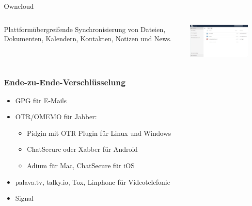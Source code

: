 \documentclass[12pt, xcolor={svgnames,table}]{beamer}
\begin{document}
\begin{frame}{Owncloud}
  \begin{columns}
    \column{4cm}
    \footnotesize

    Plattformübergreifende Synchronisierung von Dateien, Dokumenten, Kalendern, Kontakten, Notizen und News.

    \column{6cm}

    \begin{center}
      \includegraphics[width=6cm]{img/owncloud-screenshot.jpg}
    \par\end{center}
  \end{columns}
\end{frame}

\begin{frame}
  \frametitle{Ende-zu-Ende-Verschlüsselung}
  \begin{itemize}
    \item<1-> GPG für E-Mails
    \item<2-> OTR/OMEMO für Jabber:
      \begin{itemize}
        \item Pidgin mit OTR-Plugin für Linux und Windows
        \item ChatSecure oder Xabber für Android
        \item Adium für Mac, ChatSecure für iOS
      \end{itemize}
    \item<3-> palava.tv, talky.io, Tox, Linphone für Videotelefonie
    \item<4-> Signal
  \end{itemize}
\end{frame}
\end{document}
